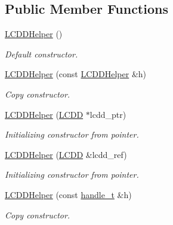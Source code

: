 \subsection*{Public Member Functions}
\begin{DoxyCompactItemize}
\item 
\hyperlink{class_d_d4hep_1_1_geometry_1_1_l_c_d_d_helper_a4475a02b960e4d0572dcb186139066f2}{LCDDHelper} ()
\begin{DoxyCompactList}\small\item\em Default constructor. \item\end{DoxyCompactList}\item 
\hyperlink{class_d_d4hep_1_1_geometry_1_1_l_c_d_d_helper_a0dea6c284dee2995a20ad50486c73a7d}{LCDDHelper} (const \hyperlink{class_d_d4hep_1_1_geometry_1_1_l_c_d_d_helper}{LCDDHelper} \&h)
\begin{DoxyCompactList}\small\item\em Copy constructor. \item\end{DoxyCompactList}\item 
\hyperlink{class_d_d4hep_1_1_geometry_1_1_l_c_d_d_helper_a7b67df64bd69db0925571a28a4bd71b5}{LCDDHelper} (\hyperlink{class_d_d4hep_1_1_geometry_1_1_l_c_d_d}{LCDD} $\ast$lcdd\_\-ptr)
\begin{DoxyCompactList}\small\item\em Initializing constructor from pointer. \item\end{DoxyCompactList}\item 
\hyperlink{class_d_d4hep_1_1_geometry_1_1_l_c_d_d_helper_a086987c0a25ab742409a82a6f1bce2ed}{LCDDHelper} (\hyperlink{class_d_d4hep_1_1_geometry_1_1_l_c_d_d}{LCDD} \&lcdd\_\-ref)
\begin{DoxyCompactList}\small\item\em Initializing constructor from pointer. \item\end{DoxyCompactList}\item 
\hyperlink{class_d_d4hep_1_1_geometry_1_1_l_c_d_d_helper_ae1ee4bd05ac79164b7fc6951b1830da6}{LCDDHelper} (const \hyperlink{class_d_d4hep_1_1_handle}{handle\_\-t} \&h)
\begin{DoxyCompactList}\small\item\em Copy constructor. \item\end{DoxyCompactList}\item 

\end{DoxyCompactItemize}
